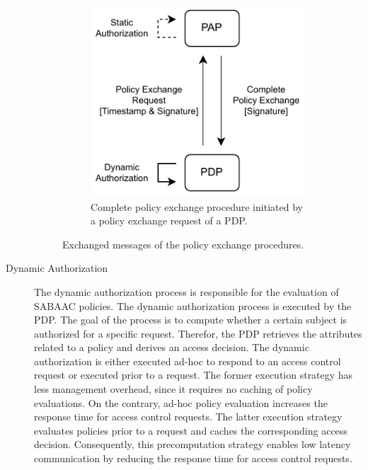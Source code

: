 \begin{description}
\begin{figure}
\begin{subfigure}[t]{0.48\linewidth}
            \includegraphics[width=\linewidth]{figures/SABAAC_protocols_authorization_dynamic_policyexchange_complete.drawio.pdf}
            \caption{Complete policy exchange procedure initiated by a policy exchange request of a PDP.}
            \label{fig:sabaac_authorization_dynamic_policyexchange_complete}
        \end{subfigure}
        \caption{Exchanged messages of the policy exchange procedures.
        }
        \label{fig:sabaac_authorization_dynamic_policyexchange}
    \end{figure}
    \item[Dynamic Authorization] The dynamic authorization process is responsible for the evaluation of SABAAC policies.
    The dynamic authorization process is executed by the PDP.
    The goal of the process is to compute whether a certain subject is authorized for a specific request.
    Therefor, the PDP retrieves the attributes related to a policy and derives an access decision.
    The dynamic authorization is either executed ad-hoc to respond to an access control request or executed prior to a request.
    The former execution strategy has less management overhead, since it requires no caching of policy evaluations.
    On the contrary, ad-hoc policy evaluation increases the response time for access control requests.
    The latter execution strategy evaluates policies prior to a request and caches the corresponding access decision.
    Consequently, this precomputation strategy enables low latency communication by reducing the response time for access control requests.
\end{description}

